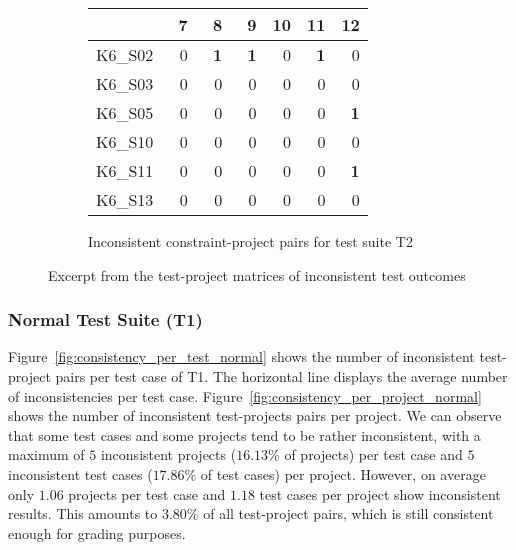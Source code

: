\begin{figure}[htpb]
\begin{subfigure}{.4\textwidth}
        \setlength{\tabcolsep}{0.2em}
        \tiny
        \begin{tabular}{l|rrrrrr}
            \toprule
                    & \ 7        & \ 8        & \ 9        & 10         & 11         & 12         \\
            \midrule
            K6\_S02 & 0          & \textbf{1} & \textbf{1} & 0          & \textbf{1} & 0          \\
            K6\_S03 & 0          & 0          & 0          & 0          & 0          & 0          \\
            K6\_S05 & 0          & 0          & 0          & 0          & 0          & \textbf{1} \\
            K6\_S10 & 0          & 0          & 0          & 0          & 0          & 0          \\
            K6\_S11 & 0          & 0          & 0          & 0          & 0          & \textbf{1} \\
            K6\_S13 & 0          & 0          & 0          & 0          & 0          & 0          \\
            \bottomrule
        \end{tabular}
        \caption{Inconsistent constraint-project pairs for test suite T2}
        \label{tab:inconsistency_matrix_excerpt_constraint}
        \setlength{\tabcolsep}{\defaulttabcolsep}
    \end{subfigure}

    \vspace{-3\bigskipamount}
    \caption{Excerpt from the test-project matrices of inconsistent test outcomes}
    \label{tab:inconsistency_matrices_excerpt}
\end{figure}

\subsubsection{Normal Test Suite (T1)}

\noindent Figure~\ref{fig:consistency_per_test_normal} shows the number of inconsistent test-project pairs per test case of T1.
The horizontal line displays the average number of inconsistencies per test case.
Figure~\ref{fig:consistency_per_project_normal} shows the number of inconsistent test-projects pairs per project.
We can observe that some test cases and some projects tend to be rather inconsistent,
with a maximum of $5$ inconsistent projects ($16.13\%$ of projects) per test case and $5$ inconsistent test cases ($17.86\%$ of test cases) per project.
However, on average only $1.06$ projects per test case and $1.18$ test cases per project show inconsistent results.
This amounts to $3.80\%$ of all test-project pairs, which is still consistent enough for grading purposes.
\parspace

